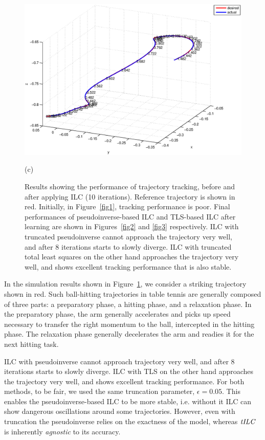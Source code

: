 \documentclass[10pt,a4paper]{article}
\theoremstyle{plain}
\theoremstyle{definition}
\newcommand{\alg}{\emph{tILC}}
\begin{document}
\begin{figure}[!htb]
\begin{minipage}{.32\textwidth}
        \includegraphics[width=\linewidth, height=0.15\textheight]{afterILCTLS.eps}
        \caption{(c)}
        \label{fig3}
    \end{minipage}
    \caption{Results showing the performance of trajectory tracking, before and after applying ILC (10 iterations). Reference trajectory is shown in red. Initially, in Figure~\ref{fig1}, tracking performance is poor. Final performances of pseudoinverse-based ILC and TLS-based ILC after learning are shown in Figures~\ref{fig2} and \ref{fig3} respectively. ILC with truncated pseudoinverse cannot approach the trajectory very well, and after 8 iterations starts to slowly diverge. ILC with truncated total least squares on the other hand approaches the trajectory very well, and shows excellent tracking performance that is also stable.}
\label{FigureILC}
\end{figure}

In the simulation results shown in Figure~\ref{FigureILC}, we consider a striking trajectory shown in red. Such ball-hitting trajectories in table tennis are generally composed of three parts: a preparatory phase, a hitting phase, and a relaxation phase. In the preparatory phase, the arm generally accelerates and picks up speed necessary to transfer the right momentum to the ball, intercepted in the hitting phase. The relaxation phase generally decelerates the arm and readies it for the next hitting task. 

ILC with pseudoinverse cannot approach trajectory very well, and after 8 iterations starts to slowly diverge. ILC with TLS on the other hand approaches the trajectory very well, and shows excellent tracking performance. For both methods, to be fair, we used the same truncation parameter, $\epsilon = 0.05$. This enables the pseudoinverse-based ILC to be more stable, i.e. without it ILC can show dangerous oscillations around some trajectories. However, even with truncation the pseudoinverse relies on the exactness of the model, whereas $\alg$ is inherently \emph{agnostic} to its accuracy. 
\end{document}
